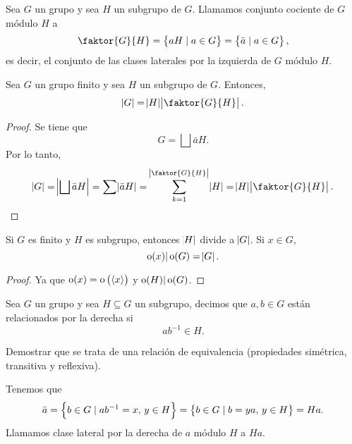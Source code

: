 \begin{defi}
    Sea $G$ un grupo y sea $H$ un subgrupo de $G$. Llamamos conjunto cociente de $G$ módulo $H$ a 
    \[
        \faktor{G}{H} = \setb{aH \mid a \in G} = \setb{ \bar{a} \mid a \in G},
    \]
    es decir, el conjunto de las clases laterales por la izquierda de $G$ módulo $H$.
    
\end{defi}

\begin{teo}[de Lagrange]
    Sea $G$ un grupo finito y sea $H$ un subgrupo de $G$. Entonces,
    \[
        \abs{G} = \abs{H} \abs{\faktor{G}{H}}.
    \]
\end{teo}

\begin{proof}
    Se tiene que
    \[
        G = \bigsqcup \bar{a}H.
    \]
    Por lo tanto,
    \[
        \abs{G} = \abs{\bigsqcup \bar{a}H} = \sum \abs{\bar{a}H} = \sum^{\abs{\faktor{G}{H}}}_{k = 1} \abs{H} = \abs{H} \abs{\faktor{G}{H}}.
    \]
\end{proof}

\begin{col}
    Si $G$ es finito y $H$ es subgrupo, entonces $\abs{H}$ divide a $\abs{G}$. Si $x \in G$,
    \[
        \operatorname{o}(x) \vert \operatorname{o}(G) = \abs{G}.
    \]
\end{col}

\begin{proof}
    Ya que $\operatorname{o}(x) = \operatorname{o}\left( \left< x \right> \right)$ y $\operatorname{o}(H) \vert \operatorname{o}(G)$.
\end{proof}

\begin{defi}
    Sea $G$ un grupo y sea $H \subseteq G$ un subgrupo, decimos que $a, b \in G$ están relacionados
    por la derecha si
    \[
        ab^{-1} \in H.
    \]
\end{defi}

\begin{ej}
    Demostrar que se trata de una relación de equivalencia (propiedades simétrica, transitiva y reflexiva).
\end{ej}

\begin{defi}
    Tenemos que
    \[
        \bar{a} = \left\{b \in G \mid ab^{-1} = x, \, y \in H\right\} = \left\{b \in G \mid b = ya, \, y \in H\right\} = Ha.
    \]
    Llamamos clase lateral por la derecha de $a$ módulo $H$ a $Ha$.
\end{defi}

